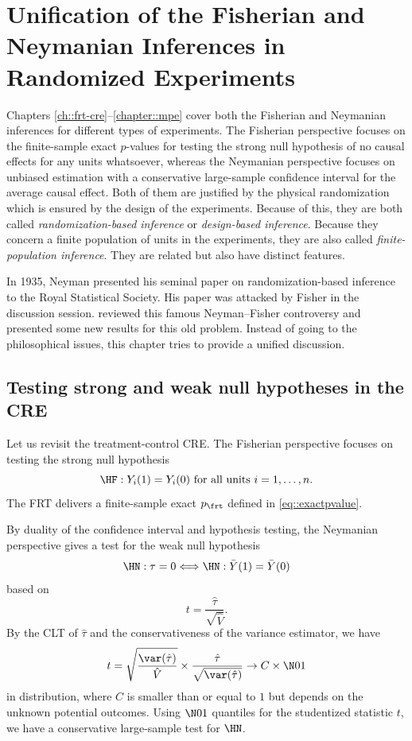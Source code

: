 \chapter{Unification of the Fisherian and Neymanian Inferences in Randomized Experiments}\label{chapter::unification-fisher-neyman}
Chapters \ref{ch::frt-cre}--\ref{chapter::mpe} cover both the Fisherian and Neymanian inferences for different types of experiments. The Fisherian perspective focuses on the finite-sample exact $p$-values for testing the strong null hypothesis of no causal effects for any units whatsoever, whereas the Neymanian perspective focuses on unbiased estimation with a conservative large-sample confidence interval for the average causal effect. Both of them are justified by the physical randomization which is ensured by the design of the experiments. Because of this, they are both called {\it randomization-based inference} or {\it design-based inference}. Because they concern a finite population of units in the experiments, they are also called {\it finite-population inference}.  They are related but also have distinct features. 

In 1935, Neyman presented his seminal paper on randomization-based inference to the Royal Statistical Society. His paper \citep{neyman1935statistical} was attacked by Fisher in the discussion session. \cite{sabbaghi2014comments} reviewed this famous Neyman--Fisher controversy and presented some new results for this old problem. Instead of going to the philosophical issues, this chapter tries to provide a unified discussion. 

\section{Testing strong and weak null hypotheses in the CRE} 
 \label{sec::strong-weak-cre-frt}
 
 
Let us revisit the treatment-control CRE.  The Fisherian perspective focuses on testing the strong null hypothesis
$$
\HF: Y_i(1) = Y_i(0) \text{ for all units } i=1,\ldots, n.
$$
The FRT delivers a finite-sample exact $p_\frt$ defined in \eqref{eq::exactpvalue}. 
 
 
By duality of the confidence interval and hypothesis testing, the Neymanian perspective gives a test for the  weak null hypothesis
$$
\HN : \tau = 0  \Longleftrightarrow \HN: \bar{Y}(1) = \bar{Y}(0)
$$ 
based on 
$$
t= 
\frac{\hat{\tau} }{  \sqrt{  \hat{V}    } }  .
$$
By the CLT of $\hat\tau$ and the conservativeness of the variance estimator, we have 
$$
t  =   \sqrt{  \frac{ \var(\hat{\tau}) }{ \hat{V} } } \times  \frac{\hat{\tau} }{  \sqrt{  \var(\hat{\tau})   } }    \rightarrow  C \times   \N01 
$$
in distribution, where $C$ is smaller than or equal to $1$ but depends on the unknown potential outcomes. Using $\N01$ quantiles for the studentized statistic $t$, we have a conservative large-sample test for $\HN$. 


